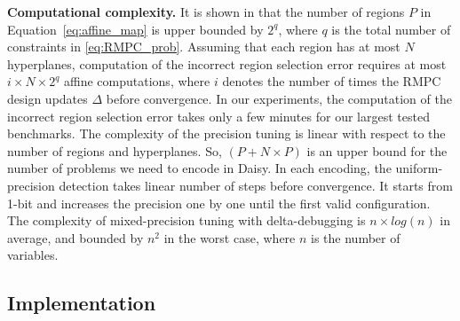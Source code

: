 \smallskip
\noindent
\textbf{Computational complexity.} 
It is shown in \cite{Alessio2009} that the number of regions $P$ 
in Equation~\eqref{eq:affine_map} is upper bounded by $2^q$, where $q$ is the total number of constraints in \autoref{eq:RMPC_prob}.
Assuming that each region has at most $N$ hyperplanes, computation of the incorrect region selection error requires at 
most $i\times N\times 2^q$ affine computations, where $i$ denotes the number of times the RMPC design updates $\Delta$ before convergence. 
In our experiments, the computation of the incorrect region selection error takes only a few minutes for our largest tested benchmarks. 
The complexity of the precision tuning is linear with respect to the number of regions and hyperplanes. 
So, $(P+ N\times P)$ is an upper bound for the number of problems we need to encode in Daisy.
In each encoding, the uniform-precision detection takes linear number of steps  before convergence. 
It starts from 1-bit and increases the precision one by one until the first valid configuration. 
The complexity of mixed-precision tuning with delta-debugging is $n\times log(n)$ in average, 
and bounded by $n^2$ in the worst case, where $n$ is the number of variables. 





\subsection{Implementation}

